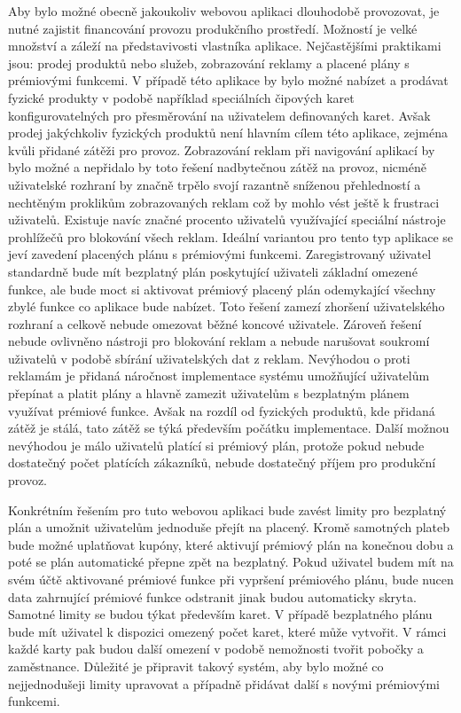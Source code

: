 		Aby bylo možné obecně jakoukoliv webovou aplikaci dlouhodobě provozovat, je nutné zajistit financování provozu
		produkčního prostředí.
		Možností je velké množství a záleží na představivosti vlastníka aplikace.
		Nejčastějšími praktikami jsou: prodej produktů nebo služeb, zobrazování reklamy a placené plány s prémiovými funkcemi.
		V případě této aplikace by bylo možné nabízet a prodávat fyzické produkty v podobě například speciálních čipových karet
		konfigurovatelných pro přesměrování na uživatelem definovaných karet.
		Avšak prodej jakýchkoliv fyzických produktů není hlavním cílem této aplikace, zejména kvůli přidané zátěži
		pro provoz.
		Zobrazování reklam při navigování aplikací by bylo možné a nepřidalo by toto řešení nadbytečnou zátěž na provoz,
		nicméně uživatelské rozhraní by značně trpělo svojí razantně sníženou přehledností a nechtěným proklikům zobrazovaných
		reklam což by mohlo vést ještě k frustraci uživatelů.
		Existuje navíc značné procento uživatelů využívající speciální nástroje prohlížečů pro blokování všech reklam.
		Ideální variantou pro tento typ aplikace se jeví zavedení placených plánu s prémiovými funkcemi.
		Zaregistrovaný uživatel standardně bude mít bezplatný plán poskytující uživateli základní omezené funkce, ale
		bude moct si aktivovat prémiový placený plán odemykající všechny zbylé funkce co aplikace bude nabízet.
		Toto řešení zamezí zhoršení uživatelského rozhraní a celkově nebude omezovat běžné koncové uživatele.
		Zároveň řešení nebude ovlivněno nástroji pro blokování reklam a nebude narušovat soukromí uživatelů v podobě
		sbírání uživatelských dat z reklam.
		Nevýhodou o proti reklamám je přidaná náročnost implementace systému umožňující uživatelům přepínat a platit
		plány a hlavně zamezit uživatelům s bezplatným plánem využívat prémiové funkce.
		Avšak na rozdíl od fyzických produktů, kde přidaná zátěž je stálá, tato zátěž se týká především počátku implementace.
		Další možnou nevýhodou je málo uživatelů platící si prémiový plán, protože pokud nebude dostatečný počet
		platících zákazníků, nebude dostatečný příjem pro produkční provoz.

		Konkrétním řešením pro tuto webovou aplikaci bude zavést limity pro bezplatný plán a umožnit uživatelům jednoduše
		přejít na placený.
		Kromě samotných plateb bude možné uplatňovat kupóny, které aktivují prémiový plán na konečnou dobu a poté se plán
		automatické přepne zpět na bezplatný.
		Pokud uživatel budem mít na svém účtě aktivované prémiové funkce při vypršení prémiového plánu, bude nucen
		data zahrnující prémiové funkce odstranit jinak budou automaticky skryta.
		Samotné limity se budou týkat především karet.
		V případě bezplatného plánu bude mít uživatel k dispozici omezený počet karet, které může vytvořit.
		V rámci každé karty pak budou další omezení v podobě nemožnosti tvořit pobočky a zaměstnance.
		Důležité je připravit takový systém, aby bylo možné co nejjednodušeji limity upravovat a případně přidávat další
		s novými prémiovými funkcemi.

